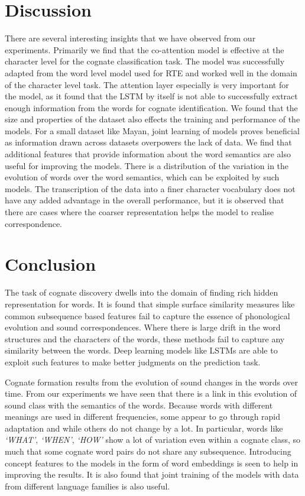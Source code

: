 \documentclass[11pt,letterpaper]{article}
\begin{document}
\section{Discussion}

There are several interesting insights that we have observed from our experiments. Primarily we find that the co-attention model is effective at the character level for the cognate classification task. The model was successfully adapted from the word level model used for RTE and worked well in the domain of the character level task. The attention layer especially is very important for the model, as it found that the LSTM by itself is not able to successfully extract enough information from the words for cognate identification. We found that the size and properties of the dataset also effects the training and performance of the models. For a small dataset like Mayan, joint learning of models proves beneficial as information drawn across datasets overpowers the lack of data. We find that additional features that provide information about the word semantics are also useful for improving the models. There is a distribution of the variation in the evolution of words over the word semantics, which can be exploited by such models. The transcription of the data into a finer character vocabulary does not have any added advantage in the overall performance, but it is observed that there are cases where the coarser representation helps the model to realise correspondence.

\section{Conclusion}

The task of cognate discovery dwells into the domain of finding rich hidden representation for words. It is found that simple surface similarity measures like common subsequence based features fail to capture the essence of phonological evolution and sound correspondences. Where there is large drift in the word structures and the characters of the words, these methods fail to capture any similarity between the words. Deep learning models like LSTMs are able to exploit such features to make better judgments on the prediction task. 

Cognate formation results from the evolution of sound changes in the words over time. From our experiments we have seen that there is a link in this evolution of sound class with the semantics of the words. Because words with different meanings are used in different frequencies, some appear to go through rapid adaptation and while others do not change by a lot. In particular, words like \textit{`WHAT'}, \textit{`WHEN'}, \textit{`HOW'} show a lot of variation even within a cognate class, so much that some cognate word pairs do not share any subsequence. Introducing concept features to the models in the form of word embeddings is seen to help in improving the results. It is also found that joint training of the models with data from different language families is also useful.
\end{document}
